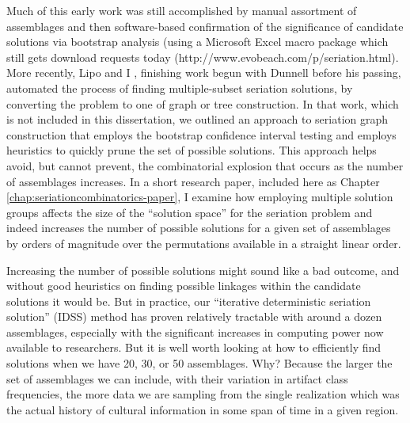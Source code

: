 Much of this early work was still accomplished by manual assortment of assemblages and then software-based confirmation of the significance of candidate solutions via bootstrap analysis (using a Microsoft Excel macro package which still gets download requests today (http://www.evobeach.com/p/seriation.html). More recently, Lipo and I \citeyearpar{Lipo2015}, finishing work begun with Dunnell before his passing, automated the process of finding multiple-subset seriation solutions, by converting the problem to one of graph or tree construction. In that work, which is not included in this dissertation, we outlined an approach to seriation graph construction that employs the bootstrap confidence interval testing and employs heuristics to quickly prune the set of possible solutions. This approach helps avoid, but cannot prevent, the combinatorial explosion that occurs as the number of assemblages increases. In a short research paper, included here as Chapter \ref{chap:seriationcombinatorics-paper}, I examine how employing multiple solution groups affects the size of the “solution space” for the seriation problem and indeed increases the number of possible solutions for a given set of assemblages by orders of magnitude over the permutations available in a straight linear order.

Increasing the number of possible solutions might sound like a bad outcome, and without good heuristics on finding possible linkages within the candidate solutions it would be. But in practice, our “iterative deterministic seriation solution” (IDSS) method has proven relatively tractable with around a dozen assemblages, especially with the significant increases in computing power now available to researchers. But it is well worth looking at how to efficiently find solutions when we have 20, 30, or 50 assemblages. Why? Because the larger the set of assemblages we can include, with their variation in artifact class frequencies, the more data we are sampling from the single realization which was the actual history of cultural information in some span of time in a given region.

